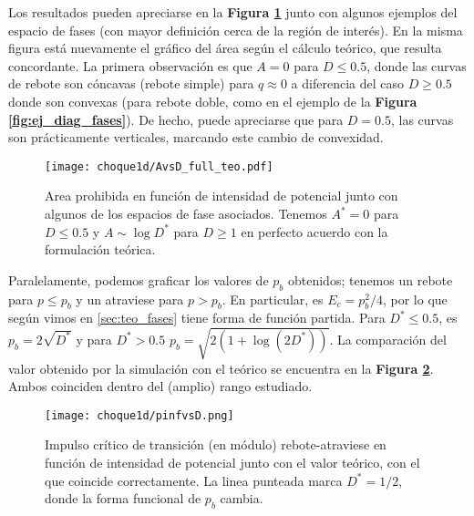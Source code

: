 Los resultados pueden apreciarse en la \textbf{Figura \ref{fig:AvsD}} junto con algunos ejemplos del espacio de fases (con mayor definición cerca de la región de interés).
En la misma figura está nuevamente el gráfico del área según el cálculo teórico, que resulta concordante.
La primera observación es que $A=0$ para $D\leq 0.5$, donde las curvas de rebote son cóncavas (rebote simple) para $q\approx 0$ a diferencia del caso $D\geq 0.5$ donde son convexas
(para rebote doble, como en el ejemplo de la \textbf{Figura \ref{fig:ej_diag_fases}}).
De hecho, puede apreciarse que para $D=0.5$, las curvas son prácticamente verticales, marcando este cambio de convexidad.

\begin{figure}[H]
	\centering
	\texttt{[image: choque1d/AvsD\_full\_teo.pdf]}
	\caption{Area prohibida en función de intensidad de potencial junto con algunos de los espacios de fase asociados.
	Tenemos $A^*=0$ para $D\leq 0.5$ y $A\sim \log{D^*}$ para $D\geq 1$ en perfecto acuerdo con la formulación teórica.}
	\label{fig:AvsD}
\end{figure}

Paralelamente, podemos graficar los valores de $p_b$ obtenidos; tenemos un rebote para $p\leq p_b$ y un atraviese para $p>p_b$.
En particular, es $E_c = p_b^2/4$, por lo que según vimos en \ref{sec:teo_fases} tiene forma de función partida.
Para $D^*\leq 0.5$, es $p_b=2\sqrt{D^*}$ y para $D^*>0.5$ $p_b=\sqrt{2(1+\log(2D^*))}$.
La comparación del valor obtenido por la simulación con el teórico se encuentra en la \textbf{Figura \ref{fig:pbvsD}}.
Ambos coinciden dentro del (amplio) rango estudiado.

\begin{figure}[H]
	\centering
	\texttt{[image: choque1d/pinfvsD.png]}
	\caption{Impulso crítico de transición (en módulo) rebote-atraviese en función de intensidad de potencial junto con el valor teórico, con el que coincide
	correctamente. La linea punteada marca $D^*=1/2$, donde la forma funcional de $p_b$ cambia.}
	\label{fig:pbvsD}
\end{figure}
